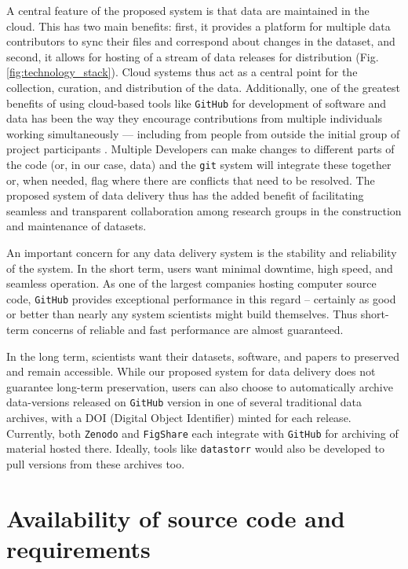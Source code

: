 \documentclass[a4paper,num-refs]{assets/oup-contemporary}
\begin{document}
A central feature of the proposed system is that data are maintained in the cloud. This has two main benefits: first, it provides a platform for multiple data contributors to sync their files and correspond about changes in the dataset, and second, it allows for hosting of a stream of data releases for distribution (Fig. \ref{fig:technology_stack}). Cloud systems thus act as a central point for the collection, curation, and distribution of the data. Additionally, one of the greatest benefits of using cloud-based tools like  \texttt{GitHub} for development of software and data has been the way they encourage contributions from multiple individuals working simultaneously --- including from people from outside the initial group of project participants \cite{Rogers-2013, Perkel-2016}. Multiple Developers can make changes to different parts of the code (or, in our case, data) and the \texttt{git} system will integrate these together or, when needed, flag where there are conflicts that need to be resolved. The proposed system of data delivery thus has the added benefit of facilitating seamless and transparent collaboration among research groups in the construction and maintenance of datasets.

An important concern for any data delivery system is the stability and reliability of the system. In the short term, users want minimal downtime, high speed, and seamless operation. As one of the largest companies hosting computer source code, \texttt{GitHub} provides exceptional performance in this regard -- certainly as good or better than nearly any system scientists might build themselves. Thus short-term concerns of reliable and fast performance are almost guaranteed.

In the long term, scientists want their datasets, software, and papers to preserved and remain accessible. While our proposed system for data delivery does not guarantee long-term preservation, users can also choose to automatically archive data-versions released on \texttt{GitHub} version in one of several traditional data archives, with a DOI (Digital Object Identifier) minted for each release. Currently, both \texttt{Zenodo} and  \texttt{FigShare} each integrate with \texttt{GitHub} for archiving of material hosted there. Ideally, tools like \texttt{datastorr} would also be developed to pull versions from these archives too. 

\section{Availability of source code and requirements}
\end{document}
